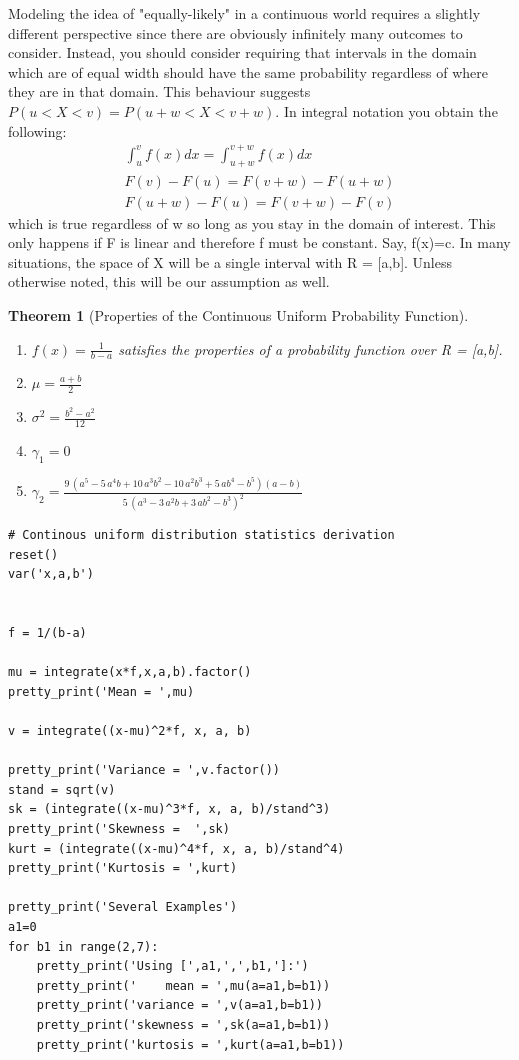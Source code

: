 \documentclass[10pt,]{book}
\theoremstyle{plain}
\newtheorem{theorem}{Theorem}[section]
\theoremstyle{definition}
\theoremstyle{definition}
\theoremstyle{definition}
\numberwithin{equation}{section}
\newcommand{\lt}{ < }
\begin{document}
	Modeling the idea of "equally-likely" in a continuous world requires a slightly different perspective since there are obviously infinitely many outcomes to consider. Instead, you should consider requiring that intervals in the domain which are of equal width should have the same probability regardless of where they are in that domain. This behaviour suggests \(P(u \lt X \lt v) = P(u + w \lt X \lt v + w)\).  In integral notation you obtain the following:
	\begin{gather*}
\int_u^v f(x) dx = \int_{u+w}^{v+w} f(x) dx\\
F(v)-F(u) = F(v+w)-F(u+w)\\
F(u+w)-F(u) = F(v+w)-F(v)
\end{gather*}
	which is true regardless of w so long as you stay in the domain of interest. This only happens if F is linear and therefore f must be constant. Say, f(x)=c. In many situations, the space of X will be a single interval with R = [a,b]. Unless otherwise noted, this will be our assumption as well.
\begin{theorem}[{Properties of the Continuous Uniform Probability Function}]\label{theorem-34}
\leavevmode%
\begin{enumerate}
\item\hypertarget{li-177}{}\(f(x) = \frac{1}{b-a}\) satisfies the properties of a probability function over R = [a,b].%
\item\hypertarget{li-178}{}\(\mu = \frac{a+b}{2}\)%
\item\hypertarget{li-179}{}\(\sigma^2 = \frac{b^2-a^2}{12}\)%
\item\hypertarget{li-180}{}\(\gamma_1 = 0\)%
\item\hypertarget{li-181}{}\(\gamma_2 = \frac{9 \, {\left(a^{5} - 5 \, a^{4} b + 10 \, a^{3} b^{2} - 10 \, a^{2} b^{3} + 5 \, a b^{4} - b^{5}\right)} {\left(a - b\right)}}{5 \, {\left(a^{3} - 3 \, a^{2} b + 3 \, a b^{2} - b^{3}\right)}^{2}}\)%
\end{enumerate}
\end{theorem}
\begin{lstlisting}[style=sageinput]
# Continous uniform distribution statistics derivation
reset()
var('x,a,b')


f = 1/(b-a)

mu = integrate(x*f,x,a,b).factor()
pretty_print('Mean = ',mu)

v = integrate((x-mu)^2*f, x, a, b)

pretty_print('Variance = ',v.factor())
stand = sqrt(v)
sk = (integrate((x-mu)^3*f, x, a, b)/stand^3)
pretty_print('Skewness =  ',sk)
kurt = (integrate((x-mu)^4*f, x, a, b)/stand^4)
pretty_print('Kurtosis = ',kurt)

pretty_print('Several Examples')
a1=0
for b1 in range(2,7):
    pretty_print('Using [',a1,',',b1,']:')
    pretty_print('    mean = ',mu(a=a1,b=b1))
    pretty_print('variance = ',v(a=a1,b=b1))
    pretty_print('skewness = ',sk(a=a1,b=b1))
    pretty_print('kurtosis = ',kurt(a=a1,b=b1))
\end{lstlisting}
\end{document}
